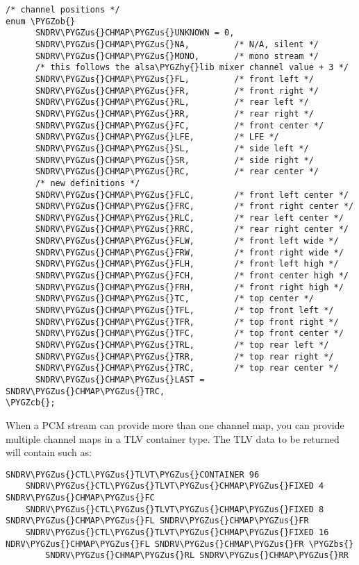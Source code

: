 \documentclass[a4paper,8pt,english]{sphinxmanual}
\def\PYGZbs{\char`\\}
\def\PYGZus{\char`\_}
\def\PYGZob{\char`\{}
\def\PYGZcb{\char`\}}
\def\PYGZhy{\char`\-}
\begin{document}
\begin{Verbatim}[commandchars=\\\{\}]
/* channel positions */
enum \PYGZob{}
      SNDRV\PYGZus{}CHMAP\PYGZus{}UNKNOWN = 0,
      SNDRV\PYGZus{}CHMAP\PYGZus{}NA,         /* N/A, silent */
      SNDRV\PYGZus{}CHMAP\PYGZus{}MONO,       /* mono stream */
      /* this follows the alsa\PYGZhy{}lib mixer channel value + 3 */
      SNDRV\PYGZus{}CHMAP\PYGZus{}FL,         /* front left */
      SNDRV\PYGZus{}CHMAP\PYGZus{}FR,         /* front right */
      SNDRV\PYGZus{}CHMAP\PYGZus{}RL,         /* rear left */
      SNDRV\PYGZus{}CHMAP\PYGZus{}RR,         /* rear right */
      SNDRV\PYGZus{}CHMAP\PYGZus{}FC,         /* front center */
      SNDRV\PYGZus{}CHMAP\PYGZus{}LFE,        /* LFE */
      SNDRV\PYGZus{}CHMAP\PYGZus{}SL,         /* side left */
      SNDRV\PYGZus{}CHMAP\PYGZus{}SR,         /* side right */
      SNDRV\PYGZus{}CHMAP\PYGZus{}RC,         /* rear center */
      /* new definitions */
      SNDRV\PYGZus{}CHMAP\PYGZus{}FLC,        /* front left center */
      SNDRV\PYGZus{}CHMAP\PYGZus{}FRC,        /* front right center */
      SNDRV\PYGZus{}CHMAP\PYGZus{}RLC,        /* rear left center */
      SNDRV\PYGZus{}CHMAP\PYGZus{}RRC,        /* rear right center */
      SNDRV\PYGZus{}CHMAP\PYGZus{}FLW,        /* front left wide */
      SNDRV\PYGZus{}CHMAP\PYGZus{}FRW,        /* front right wide */
      SNDRV\PYGZus{}CHMAP\PYGZus{}FLH,        /* front left high */
      SNDRV\PYGZus{}CHMAP\PYGZus{}FCH,        /* front center high */
      SNDRV\PYGZus{}CHMAP\PYGZus{}FRH,        /* front right high */
      SNDRV\PYGZus{}CHMAP\PYGZus{}TC,         /* top center */
      SNDRV\PYGZus{}CHMAP\PYGZus{}TFL,        /* top front left */
      SNDRV\PYGZus{}CHMAP\PYGZus{}TFR,        /* top front right */
      SNDRV\PYGZus{}CHMAP\PYGZus{}TFC,        /* top front center */
      SNDRV\PYGZus{}CHMAP\PYGZus{}TRL,        /* top rear left */
      SNDRV\PYGZus{}CHMAP\PYGZus{}TRR,        /* top rear right */
      SNDRV\PYGZus{}CHMAP\PYGZus{}TRC,        /* top rear center */
      SNDRV\PYGZus{}CHMAP\PYGZus{}LAST = SNDRV\PYGZus{}CHMAP\PYGZus{}TRC,
\PYGZcb{};
\end{Verbatim}

When a PCM stream can provide more than one channel map, you can
provide multiple channel maps in a TLV container type.  The TLV data
to be returned will contain such as:

\begin{Verbatim}[commandchars=\\\{\}]
SNDRV\PYGZus{}CTL\PYGZus{}TLVT\PYGZus{}CONTAINER 96
    SNDRV\PYGZus{}CTL\PYGZus{}TLVT\PYGZus{}CHMAP\PYGZus{}FIXED 4 SNDRV\PYGZus{}CHMAP\PYGZus{}FC
    SNDRV\PYGZus{}CTL\PYGZus{}TLVT\PYGZus{}CHMAP\PYGZus{}FIXED 8 SNDRV\PYGZus{}CHMAP\PYGZus{}FL SNDRV\PYGZus{}CHMAP\PYGZus{}FR
    SNDRV\PYGZus{}CTL\PYGZus{}TLVT\PYGZus{}CHMAP\PYGZus{}FIXED 16 NDRV\PYGZus{}CHMAP\PYGZus{}FL SNDRV\PYGZus{}CHMAP\PYGZus{}FR \PYGZbs{}
        SNDRV\PYGZus{}CHMAP\PYGZus{}RL SNDRV\PYGZus{}CHMAP\PYGZus{}RR
\end{Verbatim}
\end{document}
